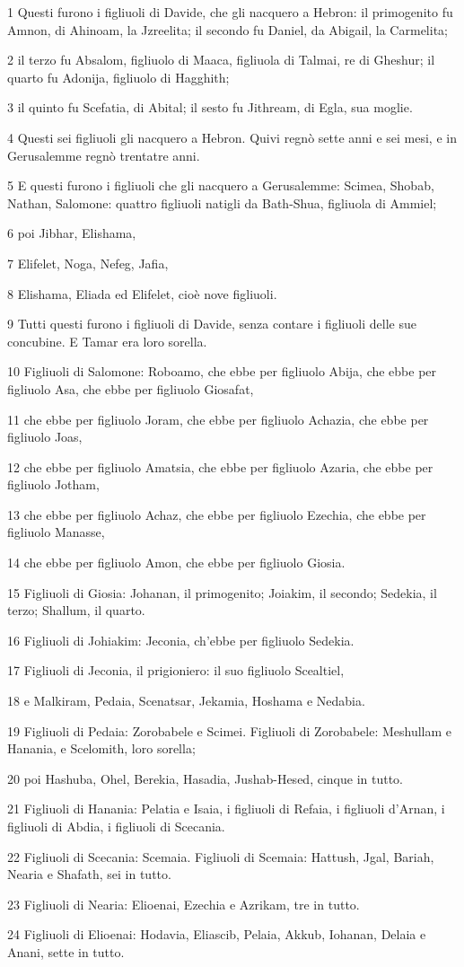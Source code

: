 \par 1 Questi furono i figliuoli di Davide, che gli nacquero a Hebron: il primogenito fu Amnon, di Ahinoam, la Jzreelita; il secondo fu Daniel, da Abigail, la Carmelita;
\par 2 il terzo fu Absalom, figliuolo di Maaca, figliuola di Talmai, re di Gheshur; il quarto fu Adonija, figliuolo di Hagghith;
\par 3 il quinto fu Scefatia, di Abital; il sesto fu Jithream, di Egla, sua moglie.
\par 4 Questi sei figliuoli gli nacquero a Hebron. Quivi regnò sette anni e sei mesi, e in Gerusalemme regnò trentatre anni.
\par 5 E questi furono i figliuoli che gli nacquero a Gerusalemme: Scimea, Shobab, Nathan, Salomone: quattro figliuoli natigli da Bath-Shua, figliuola di Ammiel;
\par 6 poi Jibhar, Elishama,
\par 7 Elifelet, Noga, Nefeg, Jafia,
\par 8 Elishama, Eliada ed Elifelet, cioè nove figliuoli.
\par 9 Tutti questi furono i figliuoli di Davide, senza contare i figliuoli delle sue concubine. E Tamar era loro sorella.
\par 10 Figliuoli di Salomone: Roboamo, che ebbe per figliuolo Abija, che ebbe per figliuolo Asa, che ebbe per figliuolo Giosafat,
\par 11 che ebbe per figliuolo Joram, che ebbe per figliuolo Achazia, che ebbe per figliuolo Joas,
\par 12 che ebbe per figliuolo Amatsia, che ebbe per figliuolo Azaria, che ebbe per figliuolo Jotham,
\par 13 che ebbe per figliuolo Achaz, che ebbe per figliuolo Ezechia, che ebbe per figliuolo Manasse,
\par 14 che ebbe per figliuolo Amon, che ebbe per figliuolo Giosia.
\par 15 Figliuoli di Giosia: Johanan, il primogenito; Joiakim, il secondo; Sedekia, il terzo; Shallum, il quarto.
\par 16 Figliuoli di Johiakim: Jeconia, ch'ebbe per figliuolo Sedekia.
\par 17 Figliuoli di Jeconia, il prigioniero: il suo figliuolo Scealtiel,
\par 18 e Malkiram, Pedaia, Scenatsar, Jekamia, Hoshama e Nedabia.
\par 19 Figliuoli di Pedaia: Zorobabele e Scimei. Figliuoli di Zorobabele: Meshullam e Hanania, e Scelomith, loro sorella;
\par 20 poi Hashuba, Ohel, Berekia, Hasadia, Jushab-Hesed, cinque in tutto.
\par 21 Figliuoli di Hanania: Pelatia e Isaia, i figliuoli di Refaia, i figliuoli d'Arnan, i figliuoli di Abdia, i figliuoli di Scecania.
\par 22 Figliuoli di Scecania: Scemaia. Figliuoli di Scemaia: Hattush, Jgal, Bariah, Nearia e Shafath, sei in tutto.
\par 23 Figliuoli di Nearia: Elioenai, Ezechia e Azrikam, tre in tutto.
\par 24 Figliuoli di Elioenai: Hodavia, Eliascib, Pelaia, Akkub, Iohanan, Delaia e Anani, sette in tutto.

